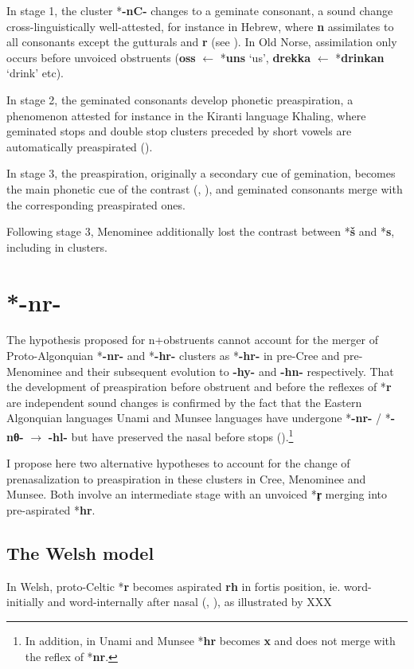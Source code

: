\documentclass[oneside,a4paper,11pt]{article}
\newcommand{\ipa}[1]{{\phon\mbox{\textbf{#1}}}}
\begin{document}
In stage 1, the cluster *\ipa{-nC-} changes to a geminate consonant, a sound change cross-linguistically well-attested, for instance in Hebrew, where \ipa{n} assimilates to all consonants except the gutturals and \ipa{r} (see \citealt[71-75]{jouon06}). In Old Norse, assimilation only occurs before unvoiced obstruents (\ipa{oss} $\leftarrow$ *\ipa{uns} `us', \ipa{drekka} $\leftarrow$ *\ipa{drinkan} `drink' etc). 

In stage 2, the geminated consonants develop phonetic preaspiration, a phenomenon attested for instance in the Kiranti language  Khaling, where geminated stops and double stop clusters preceded by short vowels are automatically preaspirated (\citealt[44]{jacques16tonogenesis}).

In stage 3, the preaspiration, originally a secondary cue of gemination, becomes the main phonetic cue of the contrast (\citealt[172]{kuemmel07wandel}, \citealt{silverman03preaspirated}), and geminated consonants merge with the corresponding preaspirated ones. 

Following stage 3, Menominee additionally lost the contrast between *\ipa{š} and *\ipa{s}, including in clusters.
  
 \section{*-nr-}
The hypothesis proposed for n+obstruents cannot account for the merger of Proto-Algonquian *\ipa{-nr-} and *\ipa{-hr-} clusters as *\ipa{-hr-} in pre-Cree and pre-Menominee and their subsequent evolution to \ipa{-hy-} and \ipa{-hn-} respectively. That the development of preaspiration before obstruent and before the reflexes of *\ipa{r} are independent sound changes is confirmed by the fact that the Eastern Algonquian languages Unami and Munsee languages have undergone *\ipa{-nr-} / *\ipa{-nθ-} $\rightarrow$ \ipa{-hl-} but have preserved the nasal before stops (\citealt[25]{goddard82munsee}).\footnote{In addition, in Unami and Munsee *\ipa{hr} becomes \ipa{x} and does not merge with the reflex of *\ipa{nr}.}

I propose here two alternative hypotheses to account for the change of prenasalization to preaspiration in these clusters in Cree, Menominee and Munsee. Both involve an intermediate stage with an unvoiced *\ipa{r̥} merging into pre-aspirated *\ipa{hr}.

\subsection{The Welsh model}
In Welsh, proto-Celtic *\ipa{r} becomes aspirated \ipa{rh} in fortis position, ie. word-initially  and word-internally after nasal (\citealt[145]{kuemmel07wandel}, \citealt[471-480]{jackson56early}), as illustrated by XXX
\end{document}
